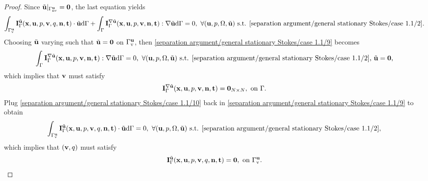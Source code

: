 \documentclass[oneside,11pt]{book}
\numberwithin{equation}{section}
\begin{document}
\begin{enumerate}[leftmargin=0mm]
\begin{itemize}[leftmargin=0in]
\begin{proof}
            Since $\tilde{\bf u}|_{\Gamma_{\rm nv}^{\bf u}} = {\bf 0}$, the last equation yields
            \begin{align}
                \label{separation argument/general stationary Stokes/case 1.1/9}
                \int_{\Gamma_{\rm v}^{\bf u}} {\bf I}_\Gamma^{\tilde{\bf u}}({\bf x},{\bf u},p,{\bf v},q,{\bf n},{\bf t})\cdot\tilde{\bf u}{\rm d}\Gamma + \int_\Gamma {\bf I}_\Gamma^{\nabla\tilde{\bf u}}({\bf x},{\bf u},p,{\bf v},{\bf n},{\bf t}):\nabla\tilde{\bf u}{\rm d}\Gamma = 0,\ \forall({\bf u},p,\Omega,\tilde{\bf u})\mbox{ s.t. \eqref{separation argument/general stationary Stokes/case 1.1/2}}.
            \end{align}
            Choosing $\tilde{\bf u}$ varying such that $\tilde{\bf u} = {\bf 0}$ on $\Gamma_{\rm v}^{\bf u}$, then \eqref{separation argument/general stationary Stokes/case 1.1/9} becomes
            \begin{align*}
                \int_\Gamma {\bf I}_\Gamma^{\nabla\tilde{\bf u}}({\bf x},{\bf u},p,{\bf v},{\bf n},{\bf t}):\nabla\tilde{\bf u}{\rm d}\Gamma = 0,\ \forall({\bf u},p,\Omega,\tilde{\bf u})\mbox{ s.t. \eqref{separation argument/general stationary Stokes/case 1.1/2}},\,\tilde{\bf u} = {\bf 0},
            \end{align*}
            which implies that ${\bf v}$ must satisfy
            \begin{align}
                \label{separation argument/general stationary Stokes/case 1.1/10}
                {\bf I}_\Gamma^{\nabla\tilde{\bf u}}({\bf x},{\bf u},p,{\bf v},{\bf n},{\bf t}) = {\bf 0}_{N\times N},\mbox{ on }\Gamma.
            \end{align}
            Plug \eqref{separation argument/general stationary Stokes/case 1.1/10} back in \eqref{separation argument/general stationary Stokes/case 1.1/9} to obtain
            \begin{align*}
                \int_{\Gamma_{\rm v}^{\bf u}} {\bf I}_\Gamma^{\tilde{\bf u}}({\bf x},{\bf u},p,{\bf v},q,{\bf n},{\bf t})\cdot\tilde{\bf u}{\rm d}\Gamma = 0,\ \forall({\bf u},p,\Omega,\tilde{\bf u})\mbox{ s.t. \eqref{separation argument/general stationary Stokes/case 1.1/2}},
            \end{align*}
            which implies that $({\bf v},q)$ must satisfy
            \begin{align}
                \label{separation argument/general stationary Stokes/case 1.1/11}
                {\bf I}_\Gamma^{\tilde{\bf u}}({\bf x},{\bf u},p,{\bf v},q,{\bf n},{\bf t}) = {\bf 0},\mbox{ on }\Gamma_{\rm v}^{\bf u}.

\end{align}
\end{proof}
\end{itemize}
\end{enumerate}
\end{document}
